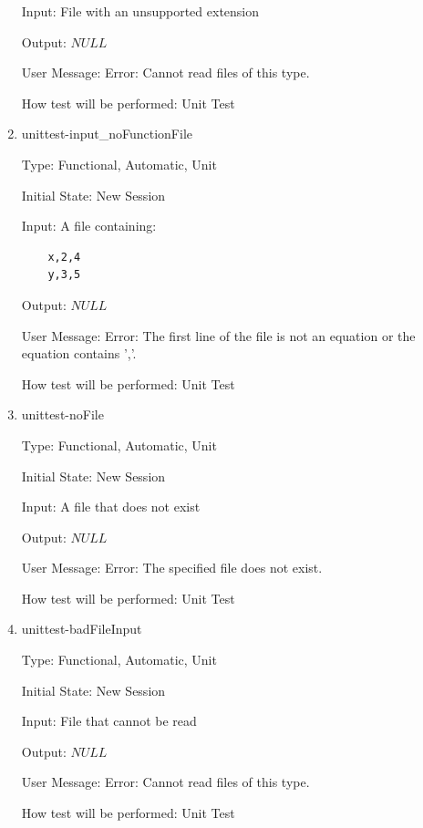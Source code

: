 \documentclass[12pt, titlepage]{article}
\begin{document}
\begin{enumerate}
	Input: File with an unsupported extension
	
	Output: $NULL$
	
	User Message: Error: Cannot read files of this type.
	
	How test will be performed: Unit Test\\
	
	\item{unittest-input\_noFunctionFile}
	
	Type: Functional, Automatic, Unit
	
	Initial State: New Session
	
	Input: A file containing:
	\begin{lstlisting}
	x,2,4
	y,3,5
	\end{lstlisting}
	
	Output: $NULL$
	
	User Message: Error: The first line of the file is not an equation or the 
	equation contains ','.
	
	How test will be performed: Unit Test\\
	
	\item{unittest-noFile}
	
	Type: Functional, Automatic, Unit
	
	Initial State: New Session
	
	Input: A file that does not exist
	
	Output: $NULL$
	
	User Message: Error: The specified file does not exist.
	
	How test will be performed: Unit Test\\
	
	\item{unittest-badFileInput}
	
	Type: Functional, Automatic, Unit
	
	Initial State: New Session
	
	Input: File that cannot be read
	
	Output: $NULL$
	
	User Message: Error: Cannot read files of this type.
	
	How test will be performed: Unit Test\\
\end{enumerate}
\end{document}
